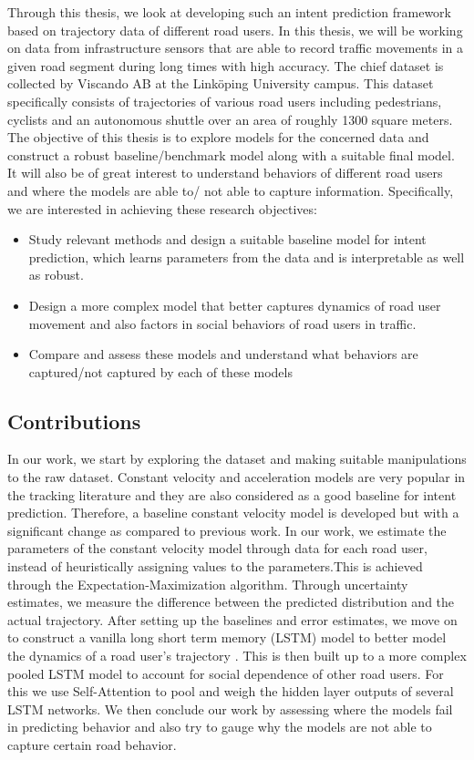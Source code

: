 \documentclass{article}
\begin{document}
Through this thesis, we look at developing such an intent prediction framework based on trajectory data of different road users. In this thesis, we will be working on data from infrastructure sensors that are able to record traffic movements in a given road segment during long times with high accuracy. The chief dataset is collected by Viscando AB at the Linköping University campus. This dataset specifically consists of trajectories of various road users including pedestrians, cyclists and an autonomous shuttle over an area of roughly 1300 square meters. The objective of this thesis is to explore models for the concerned data and construct a robust baseline/benchmark model along with a suitable final model. It will also be of great interest to understand behaviors of different road users and where the models are able to/ not able to capture information. Specifically, we are interested in achieving these research objectives:
\begin{itemize}
    \item Study relevant methods and design a suitable baseline model for intent prediction, which learns parameters from the data and is interpretable as well as robust. 
    \item Design a more complex model that better captures dynamics of road user movement and also factors in social behaviors of road users in traffic. 
    \item Compare and assess these models and understand what behaviors are captured/not captured by each of these models
\end{itemize}


\subsection{Contributions}
In our work, we start by exploring the dataset and making suitable manipulations to the raw dataset. Constant velocity\cite{cvmodel} and acceleration models are very popular in the tracking literature and they are also considered as a good baseline for intent prediction. Therefore, a baseline constant velocity model is developed but with a significant change as compared to previous work. In our work, we estimate the parameters of the constant velocity model through data for each road user, instead of heuristically assigning values to the parameters.This is achieved through the Expectation-Maximization algorithm\cite{emalgorithm}. Through uncertainty estimates, we  measure the difference between the predicted distribution and the actual trajectory.  After setting up the baselines and error estimates, we move on to construct a vanilla long short term memory (LSTM) model to better model the dynamics of a road user's trajectory . This is then built up to a more complex pooled LSTM model to account for social dependence of other road users. For this we use Self-Attention to pool and weigh the hidden layer outputs of several LSTM networks. We then conclude our work by assessing where the models fail in predicting behavior and also try to gauge why the models are not able to capture certain road behavior. 
\end{document}

